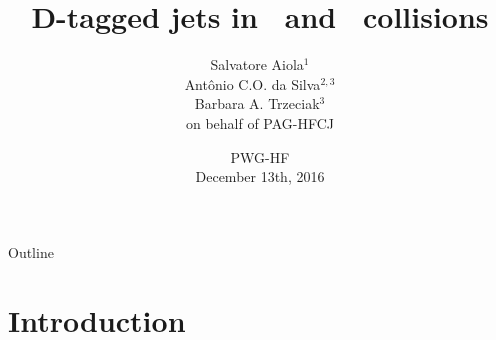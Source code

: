\documentclass[xcolor={usenames,dvipsnames}]{beamer}
\title[D-tagged jets in \pp\ and \pPb\ collisions] %
{D-tagged jets in \pp\ and \pPb\ collisions}
\author[Salvatore Aiola]%
{Salvatore Aiola$^{1}$ \\
Ant\^onio C.O. da Silva$^{2,3}$ \\
Barbara A. Trzeciak$^{3}$ \\ 
\bigskip
on behalf of PAG-HFCJ}
\institute[Yale University] %
{$^{1}$Yale University\\
$^{2}$University of S\~ao Paulo \\
$^{3}$Utrecht University}
\date[PWG-HF - Dec. 13th, 2016] %
{PWG-HF \\
December 13th, 2016}
\begin{document}
\begin{frame}
  \titlepage
\end{frame}

\begin{frame}{Outline}
    \tableofcontents
 \end{frame}





\section{Introduction}
\end{document}
